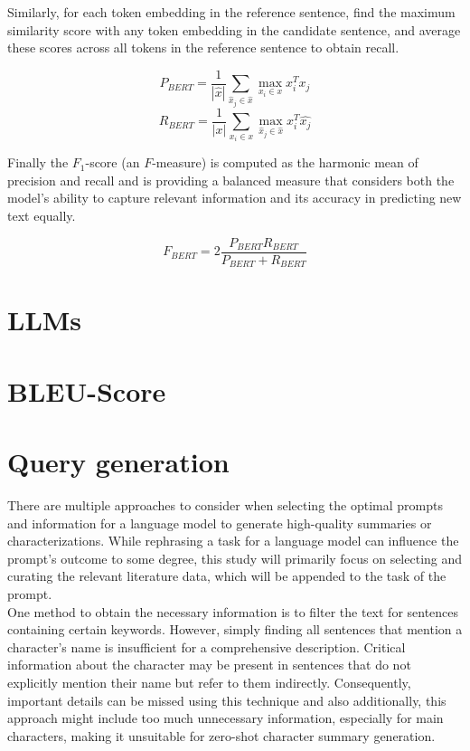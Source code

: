 Similarly, for each token embedding in the reference sentence, find the maximum similarity score with any token embedding in the candidate sentence, and average these scores across all tokens in the reference sentence to obtain recall.

\[P_{BERT} = \frac{1}{|\hat{x}|} \sum_{\hat{x}_j\in \hat{x}} \max_{x_i \in x} x_i^T \hat{x_j} \]
\[R_{BERT} = \frac{1}{|x|} \sum_{x_i \in x} \max_{\hat{x}_j\in \hat{x}} x_i^T \hat{x_j} \]



Finally the $F_1$-score (an $F$-measure)
is computed as the harmonic mean of precision and recall and is providing a balanced measure that considers both the model's ability to capture relevant information and its accuracy in predicting new text equally.

\[F_{BERT} = 2\frac{P_{BERT}R_{BERT}}{P_{BERT} + R_{BERT}} \]
\section{LLMs}
\section{BLEU-Score}



\section{Query generation}
There are multiple approaches to consider when selecting the optimal prompts and information for a language model to generate high-quality summaries or characterizations. While rephrasing a task for a language model can influence the prompt's outcome to some degree, this study will primarily focus on selecting and curating the relevant literature data, which will be appended to the task of the prompt.\\

One method to obtain the necessary information is to filter the text for sentences containing certain keywords. However, simply finding all sentences that mention a character's name is insufficient for a comprehensive description. Critical information about the character may be present in sentences that do not explicitly mention their name but refer to them indirectly. Consequently, important details can be missed using this technique and also additionally, this approach might include too much unnecessary information, especially for main characters, making it unsuitable for zero-shot character summary generation.\\

